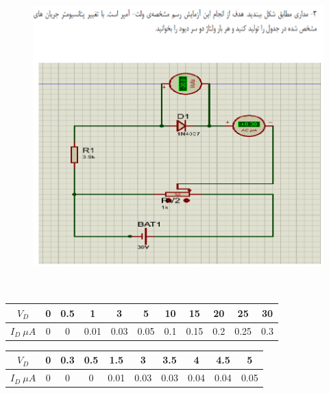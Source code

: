 \documentclass[12pt]{article}
\begin{document}
\section{}
\begin{figure}[H]
	\begin{center}
		\includegraphics[width=\textwidth, height=12cm]{./images/7.7}
	\end{center}
\end{figure}

\begin{latin}
\begin{table}[H]
\begin{adjustbox}{width=\textwidth}
\begin{tabular}{|c|c|c|c|c|c|c|c|c|c|c|}
\hline
$V_D$ & 0 & 0.5 & 1 & 3 & 5 & 10 & 15 & 20 & 25 & 30 \\
\hline
\hline
$I_D \ \mu A$ & 0 & 0 & 0.01 & 0.03 & 0.05 & 0.1 & 0.15 & 0.2 & 0.25 & 0.3 \\
\hline
\end{tabular}
\end{adjustbox}
\end{table}
\end{latin}

\begin{latin}
\begin{table}[H]
\begin{adjustbox}{width=\textwidth}
\begin{tabular}{|c|c|c|c|c|c|c|c|c|c|}
\hline
$V_D$ & 0 & 0.3 & 0.5 & 1.5 & 3 & 3.5 & 4 & 4.5 & 5\\
\hline
\hline
$I_D \ \mu A$ & 0 & 0 & 0 & 0.01 & 0.03 & 0.03 & 0.04 & 0.04 & 0.05 \\
\hline
\end{tabular}
\end{adjustbox}
\end{table}
\end{latin}
\end{document}
